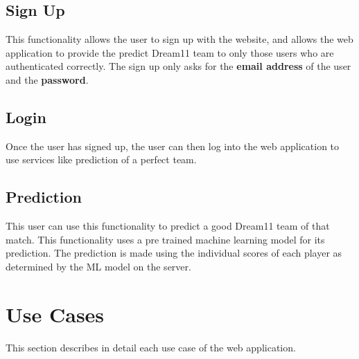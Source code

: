 \documentclass[12pt]{article}
\begin{document}
\subsection{Sign Up}
This functionality allows the user to sign up with the website, and allows the web application to provide the predict Dream11 team to only those users who are authenticated correctly. The sign up only asks for the \textbf{email address} of the user and the \textbf{password}.
\subsection{Login}
Once the user has signed up, the user can then log into the web application to use services like prediction of a perfect team.
\subsection{Prediction}
This user can use this functionality to predict a good Dream11 team of that match. This functionality uses a pre trained machine learning model for its prediction. The prediction is made using the individual scores of each player as determined by the ML model on the server.\par

\newpage
\section{Use Cases}
This section describes in detail each use case of the web application.
\end{document}
